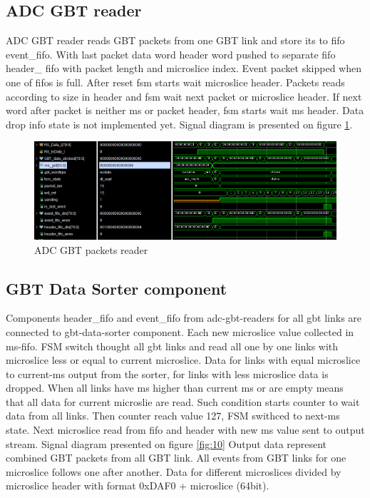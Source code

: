\documentclass{article}
\begin{document}
\subsection{ADC GBT reader}\label{sec:data-reader}
ADC GBT reader reads GBT packets from one GBT link and store its to fifo event\_fifo. With last packet data word header word pushed to separate fifo header\_ fifo with packet length and microslice index. Event packet skipped when one of fifos is full. After reset fsm starts wait microslice header. Packets reads according to size in header and fsm wait next packet or microslice header. If next word after packet is neither ms or packet header, fsm starts wait ms header. Data drop info state is not implemented yet. Signal diagram is presented on figure \ref{fig:11}. 

\begin{figure}[H]
	\centering 
	\includegraphics[width=1.0\textwidth]{ADC_GBT_reader_wave.png}
	\caption{\label{fig:11} ADC GBT packets reader}
\end{figure}



\subsection{GBT Data Sorter component}\label{sec:data-sorter}
Components header\_fifo and event\_fifo from adc-gbt-readers for all gbt links are connected to gbt-data-sorter component. Each new microslice value collected in ms-fifo. FSM switch thought all gbt links and read all one by one links with microslice less or equal to current microslice. Data for links with equal microslice to current-ms output from the sorter, for links with less microslice data is dropped. When all links have ms higher than current ms or are empty means that all data for current microslie are read. Such condition starts counter to wait data from all links. Then counter reach value 127, FSM swithced to next-ms state. Next microslice read from fifo and header with new ms value sent to output stream. Signal diagram presented on figure \ref{fig:10} Output data represent combined GBT packets from all GBT link. All events from GBT links for one microslice follows one after another. Data for different microslices divided by microslice header with format 0xDAF0 + microslice (64bit). 
\end{document}
